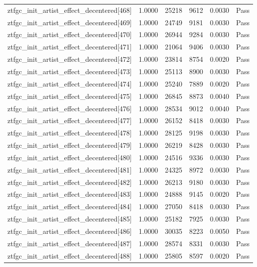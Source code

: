 \begin{table}[htbp]
\begin{tabular}{llrrll}
ztfgc\_init\_artist\_effect\_decentered[468] & 1.0000 & 25218 & 9612 & 0.0030 & Pass \\
ztfgc\_init\_artist\_effect\_decentered[469] & 1.0000 & 24749 & 9181 & 0.0030 & Pass \\
ztfgc\_init\_artist\_effect\_decentered[470] & 1.0000 & 26944 & 9284 & 0.0030 & Pass \\
ztfgc\_init\_artist\_effect\_decentered[471] & 1.0000 & 21064 & 9406 & 0.0030 & Pass \\
ztfgc\_init\_artist\_effect\_decentered[472] & 1.0000 & 23814 & 8754 & 0.0020 & Pass \\
ztfgc\_init\_artist\_effect\_decentered[473] & 1.0000 & 25113 & 8900 & 0.0030 & Pass \\
ztfgc\_init\_artist\_effect\_decentered[474] & 1.0000 & 25240 & 7889 & 0.0020 & Pass \\
ztfgc\_init\_artist\_effect\_decentered[475] & 1.0000 & 26845 & 8873 & 0.0040 & Pass \\
ztfgc\_init\_artist\_effect\_decentered[476] & 1.0000 & 28534 & 9012 & 0.0040 & Pass \\
ztfgc\_init\_artist\_effect\_decentered[477] & 1.0000 & 26152 & 8418 & 0.0030 & Pass \\
ztfgc\_init\_artist\_effect\_decentered[478] & 1.0000 & 28125 & 9198 & 0.0030 & Pass \\
ztfgc\_init\_artist\_effect\_decentered[479] & 1.0000 & 26219 & 8428 & 0.0030 & Pass \\
ztfgc\_init\_artist\_effect\_decentered[480] & 1.0000 & 24516 & 9336 & 0.0030 & Pass \\
ztfgc\_init\_artist\_effect\_decentered[481] & 1.0000 & 24325 & 8972 & 0.0030 & Pass \\
ztfgc\_init\_artist\_effect\_decentered[482] & 1.0000 & 26213 & 9180 & 0.0030 & Pass \\
ztfgc\_init\_artist\_effect\_decentered[483] & 1.0000 & 24888 & 9145 & 0.0020 & Pass \\
ztfgc\_init\_artist\_effect\_decentered[484] & 1.0000 & 27050 & 8418 & 0.0030 & Pass \\
ztfgc\_init\_artist\_effect\_decentered[485] & 1.0000 & 25182 & 7925 & 0.0030 & Pass \\
ztfgc\_init\_artist\_effect\_decentered[486] & 1.0000 & 30035 & 8223 & 0.0050 & Pass \\
ztfgc\_init\_artist\_effect\_decentered[487] & 1.0000 & 28574 & 8331 & 0.0030 & Pass \\
ztfgc\_init\_artist\_effect\_decentered[488] & 1.0000 & 25805 & 8597 & 0.0020 & Pass \\

\end{tabular}
\end{table}
